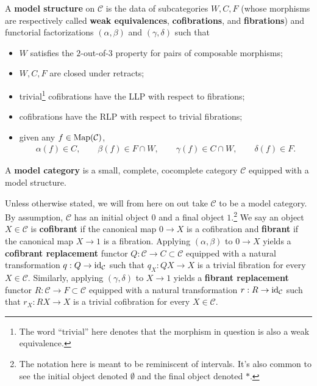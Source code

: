 \documentclass[11pt]{article}
\renewcommand{\C}{\mathcal{C}}
\begin{document}
\begin{definition}
A \textbf{model structure} on $\C$ is the data of subcategories $W,C,F$ (whose morphisms are respectively called \textbf{weak equivalences}, \textbf{cofibrations}, and \textbf{fibrations}) and functorial factorizations $(\alpha,\beta)$ and $(\gamma,\delta)$ such that
\begin{itemize}
\item $W$ satisfies the $2$-out-of-$3$ property for pairs of composable morphisms;

\item $W,C,F$ are closed under retracts;

\item trivial\footnote{The word ``trivial'' here denotes that the morphism in question is also a weak equivalence.} cofibrations have the LLP with respect to fibrations;

\item cofibrations have the RLP with respect to trivial fibrations;

\item given any $f\in\Map(\C)$,
\begin{align*}
\alpha(f)\in C,
\qquad \beta(f)\in F\cap W,
\qquad \gamma(f)\in C\cap W,
\qquad \delta(f)\in F.
\end{align*}
\end{itemize}
A \textbf{model category} is a small, complete, cocomplete category $\C$ equipped with a model structure.
\end{definition}

Unless otherwise stated, we will from here on out take $\C$ to be a model category. By assumption, $\C$ has an initial object $0$ and a final object $1$.\footnote{The notation here is meant to be reminiscent of intervals. It's also common to see the initial object denoted $\emptyset$ and the final object denoted $*$.} We say an object $X\in\C$ is \textbf{cofibrant} if the canonical map $0\to X$ is a cofibration and \textbf{fibrant} if the canonical map $X\to1$ is a fibration. Applying $(\alpha,\beta)$ to $0\to X$ yields a \textbf{cofibrant replacement} functor $Q: \C\to C\subset\C$ equipped with a natural transformation $q: Q\to\id_{\C}$ such that $q_X: QX\to X$ is a trivial fibration for every $X\in\C$. Similarly, applying $(\gamma,\delta)$ to $X\to1$ yields a \textbf{fibrant replacement} functor $R: \C\to F\subset\C$ equipped with a natural transformation $r: R\to\id_{\C}$ such that $r_X: RX\to X$ is a trivial cofibration for every $X\in\C$.
\end{document}
